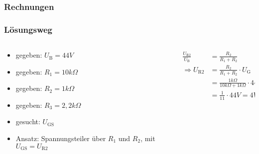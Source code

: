 \begin{frame}
\frametitle{Rechnungen}
\end{frame}

\begin{frame}
\end{frame}

\begin{frame}
\frametitle{Lösungsweg}
\begin{columns}
    \begin{column}{0.48\textwidth}
    \begin{itemize}
  \item gegeben: $U_{\textrm{B}} = 44V$
  \item gegeben: $R_1 = 10k\Omega$
  \item gegeben: $R_2 = 1k\Omega$
  \item gegeben: $R_3 = 2,2k\Omega$
  \item gesucht: $U_{\textrm{GS}}$
  \item Ansatz: Spannungsteiler über $R_1$ und $R_2$, mit $U_{\textrm{GS}} = U_{\textrm{R2}}$
  \end{itemize}

    \end{column}
   \begin{column}{0.48\textwidth}
       
    \pause
    \begin{equation}\begin{align}\nonumber \frac{U_{\textrm{R2}}}{U_{\textrm{B}}} &= \frac{R_2}{R_1+R_2}\\ \nonumber \Rightarrow U_{\textrm{R2}} &= \frac{R_2}{R_1+R_2} \cdot U_{\textrm{G}}\\ \nonumber &= \frac{1k\Omega}{10k\Omega+1k\Omega} \cdot 44V\\ \nonumber &= \frac{1}{11} \cdot 44V = 4V \end{align}\end{equation}




   \end{column}
\end{columns}

\end{frame}

